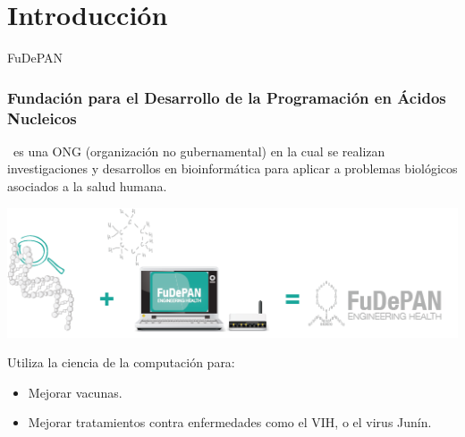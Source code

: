\section{Introducción}

\begin{subsection}{FuDePAN}

	\begin{frame}\frametitle{\small{Fundación para el Desarrollo de la Programación en Ácidos Nucleicos}}
		\fudepan \ es una ONG (organización no gubernamental) en la cual se realizan investigaciones y desarrollos en bioinformática para
		aplicar a problemas biológicos asociados a la salud humana.\\[.5cm]
		
		\begin{center}
			\includegraphics[scale=0.4]{images/fudepan-que-hacemos.png}
		\end{center}
		 
		\pause Utiliza la ciencia de la computación para:
		
		\begin{itemize}
			\item Mejorar vacunas.
		    \item Mejorar tratamientos contra enfermedades como el VIH, o el virus Junín.
		\end{itemize}
	\end{frame}
	
\end{subsection}

